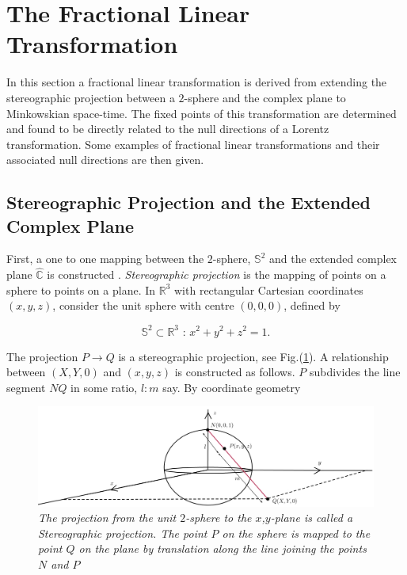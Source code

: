 \section{The Fractional Linear Transformation}\label{Fractional_Section_Extended_Complex}

In this section a fractional linear transformation is derived from extending the stereographic projection between a $2$-sphere and the complex plane to Minkowskian space-time. The fixed points of this transformation are determined and found to be directly related to the null directions of a Lorentz transformation. Some examples of fractional linear transformations and their associated null directions are then given. 

\subsection{Stereographic Projection and the Extended Complex Plane}\label{Section_Stereographic_Extended_Complex}

First, a one to one mapping between the $2$-sphere, $\mathbb{S}^2$ and the extended complex plane $\hat{\mathbb{C}}$ is constructed \cite[p. 10]{Spinors_I_Penrose}. \textit{Stereographic projection} is the mapping of points on a sphere to points on a plane. In $\mathbb{R}^3$ with rectangular Cartesian coordinates $(x, y, z)$, consider the unit sphere with centre $(0,0,0)$, defined by

\begin{equation*}
\mathbb{S}^2 \subset \mathbb{R}^3 \text{ : } x^2 + y^2 + z^2 = 1.
\end{equation*}

\noindent The projection $P \rightarrow Q$ is a stereographic projection, see Fig.(\ref{Stereographic_Projecttion_Fig}). A relationship between $(X,Y,0)$ and $(x,y,z)$ is constructed as follows. $P$ subdivides the line segment $NQ$ in some ratio, $l:m$ say. By coordinate geometry 

\begin{figure}[h!]
\begin{center}
\caption{\textit{The projection from the unit $2$-sphere to the $x$,$y$-plane is called a Stereographic projection. The point $P$ on the sphere is mapped to the point $Q$ on the plane by translation along the line joining the points $N$ and $P$}}
\label{Stereographic_Projecttion_Fig}
\includegraphics[scale=0.50,angle = 1,origin = c]{figs/4_1.jpg}
\end{center}
\end{figure}

